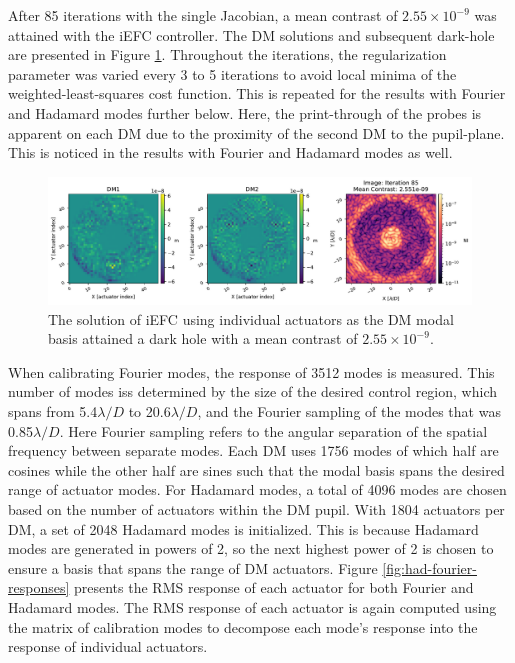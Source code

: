 \documentclass[12pt]{spieman}  %
\begin{document}
\begin{spacing}{2}
After 85 iterations with the single Jacobian, a mean contrast of $2.55\times10^{-9}$ was attained with the iEFC controller. The DM solutions and subsequent dark-hole are presented in Figure \ref{fig:spc-825-poke_modes}. Throughout the iterations, the regularization parameter was varied every 3 to 5 iterations to avoid local minima of the weighted-least-squares cost function. This is repeated for the results with Fourier and Hadamard modes further below. Here, the print-through of the probes is apparent on each DM due to the proximity of the second DM to the pupil-plane. This is noticed in the results with Fourier and Hadamard modes as well.

\begin{figure}[h]
    \centering
    \includegraphics[scale=0.5]{figs-spc-825/spc_825_poke_modes_poke_probes.pdf}
    \caption{The solution of iEFC using individual actuators as the DM modal basis attained a dark hole with a mean contrast of $2.55\times10^{-9}$.}
    \label{fig:spc-825-poke_modes}
\end{figure}

When calibrating Fourier modes, the response of 3512 modes is measured. This number of modes iss determined by the size of the desired control region, which spans from 5.4$\lambda/D$ to 20.6$\lambda/D$, and the Fourier sampling of the modes that was 0.85$\lambda/D$. Here Fourier sampling refers to the angular separation of the spatial frequency between separate modes. Each DM uses 1756 modes of which half are cosines while the other half are sines such that the modal basis spans the desired range of actuator modes. For Hadamard modes, a total of 4096 modes are chosen based on the number of actuators within the DM pupil. With 1804 actuators per DM, a set of 2048 Hadamard modes is initialized. This is because Hadamard modes are generated in powers of 2, so the next highest power of 2 is chosen to ensure a basis that spans the range of DM actuators. Figure \ref{fig:had-fourier-responses} presents the RMS response of each actuator for both Fourier and Hadamard modes. The RMS response of each actuator is again computed using the matrix of calibration modes to decompose each mode's response into the response of individual actuators. 


\end{spacing}
\end{document}
